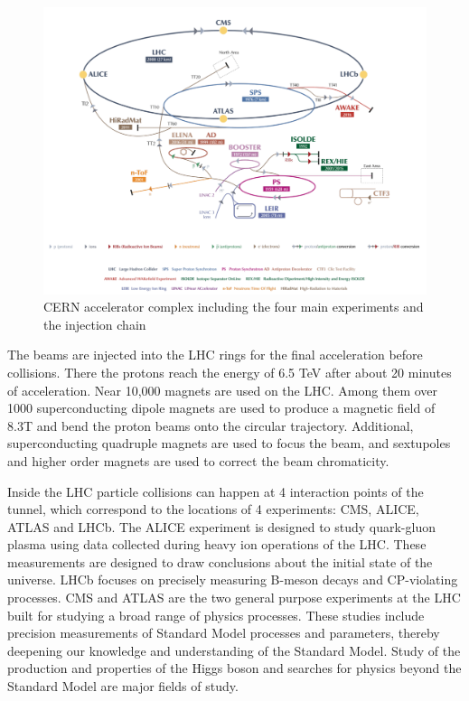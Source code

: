 \begin{figure}[htbp]
\begin{center}
\includegraphics[width=0.72\linewidth]{figures/lhc_lhc.pdf}
\caption{CERN accelerator complex including the four main experiments and the injection chain}
\label{fig:lhc_lhc}
\end{center}
\end{figure}

\vspace{0.3cm}
The beams are injected into the LHC rings for the final acceleration before collisions. There the protons reach the energy of 6.5 TeV after about 20 minutes of acceleration. Near 10,000 magnets are used on the LHC. Among them over 1000 superconducting dipole magnets are used to produce a magnetic field of 8.3T and bend the proton beams onto the circular trajectory. Additional, superconducting quadruple magnets are used to focus the beam, and sextupoles and higher order magnets are used to correct the beam chromaticity.

\vspace{0.3cm}
Inside the LHC particle collisions can happen at 4 interaction points of the tunnel, which correspond to the locations of 4 experiments: CMS, ALICE, ATLAS and LHCb. The ALICE experiment is designed to study quark-gluon plasma using data collected during heavy ion operations of the LHC. These measurements are designed to draw conclusions about the initial state of the universe. LHCb focuses on precisely measuring B-meson decays and CP-violating processes. CMS and ATLAS are the two general purpose experiments at the LHC built for studying a broad range of physics processes. These studies include precision measurements of Standard Model processes and parameters, thereby deepening our knowledge and understanding of the Standard Model. Study of the production and properties of the Higgs boson and searches for physics beyond the Standard Model are major fields of study.

